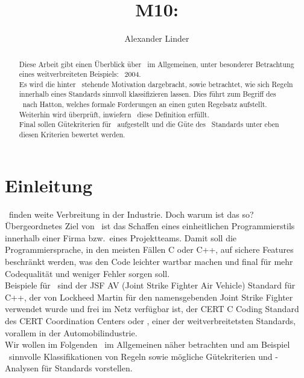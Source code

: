 \documentclass[a4paper,UKenglish,cleveref, autoref]{templates/lipics-v2019}
\title{M10: \sqss}
\author{Alexander Linder}{Karlsruhe Institute of Technology, Germany \and \url{https://kit.edu} }{alexander.linder@student.kit.edu}{}{}
\begin{document}
    \maketitle

    \begin{abstract}
        Diese Arbeit gibt einen Überblick über \sqss\ im Allgemeinen, unter besonderer Betrachtung eines weitverbreiteten Beispiels: \misra\ 2004.\\
        Es wird die hinter \sqss\ stehende Motivation dargebracht, sowie betrachtet, wie sich Regeln innerhalb eines Standards sinnvoll klassifizieren lassen.
        Dies führt zum Begriff des \slss\ nach Hatton, welches formale Forderungen an einen guten Regelsatz aufstellt.
        Weiterhin wird überprüft, inwiefern \misra\ diese Definition erfüllt.\\
        Final sollen Gütekriterien für \sqss\ aufgestellt und die Güte des \misra\ Standards unter eben diesen Kriterien bewertet werden.
    \end{abstract}

    \section{Einleitung}
    \label{sec:einleitung}
    \sqss\ finden weite Verbreitung in der Industrie.
    Doch warum ist das so?
    Übergeordnetes Ziel von \sqss\ ist das Schaffen eines einheitlichen Programmierstils innerhalb einer Firma bzw.\ eines
    Projektteams.
    Damit soll die Programmiersprache, in den meisten Fällen C oder C++, auf sichere Features beschränkt werden, was den
    Code leichter wartbar machen und final für mehr Codequalität und weniger Fehler sorgen soll.\\
    Beispiele für \sqss\ sind der JSF AV (Joint Strike Fighter Air Vehicle) Standard für C++, der von Lockheed Martin
    für den namensgebenden Joint Strike Fighter verwendet wurde und frei im Netz verfügbar ist, der CERT C Coding
    Standard des CERT Coordination Centers oder \misra, einer der weitverbreitetsten Standards, vorallem in der
    Automobilindustrie.\\
    Wir wollen im Folgenden \sqss\ im Allgemeinen näher betrachten und am Beispiel \misra\ sinnvolle Klassifikationen
    von Regeln sowie mögliche Gütekriterien und -Analysen für Standards vorstellen.
\end{document}
